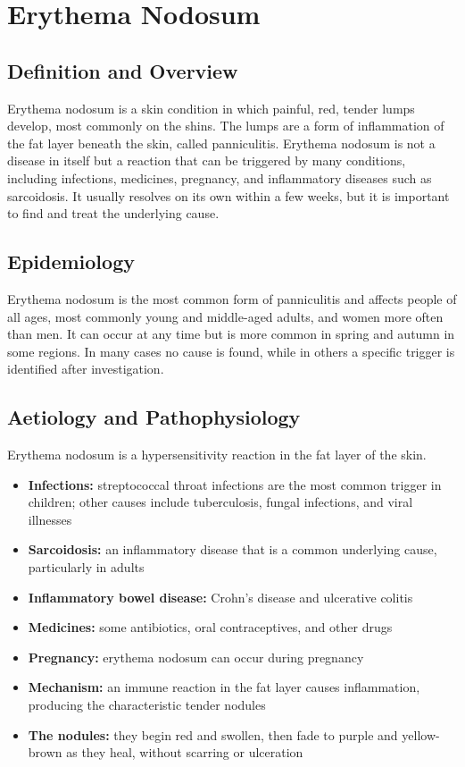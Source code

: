 \chapter{Erythema Nodosum}

\section*{Definition and Overview}
Erythema nodosum is a skin condition in which painful, red, tender lumps develop, most commonly on the shins. The lumps are a form of inflammation of the fat layer beneath the skin, called panniculitis. Erythema nodosum is not a disease in itself but a reaction that can be triggered by many conditions, including infections, medicines, pregnancy, and inflammatory diseases such as sarcoidosis. It usually resolves on its own within a few weeks, but it is important to find and treat the underlying cause.

\section*{Epidemiology}
Erythema nodosum is the most common form of panniculitis and affects people of all ages, most commonly young and middle-aged adults, and women more often than men. It can occur at any time but is more common in spring and autumn in some regions. In many cases no cause is found, while in others a specific trigger is identified after investigation.

\section*{Aetiology and Pathophysiology}
Erythema nodosum is a hypersensitivity reaction in the fat layer of the skin.
\begin{itemize}
    \item \textbf{Infections:} streptococcal throat infections are the most common trigger in children; other causes include tuberculosis, fungal infections, and viral illnesses
    \item \textbf{Sarcoidosis:} an inflammatory disease that is a common underlying cause, particularly in adults
    \item \textbf{Inflammatory bowel disease:} Crohn's disease and ulcerative colitis
    \item \textbf{Medicines:} some antibiotics, oral contraceptives, and other drugs
    \item \textbf{Pregnancy:} erythema nodosum can occur during pregnancy
    \item \textbf{Mechanism:} an immune reaction in the fat layer causes inflammation, producing the characteristic tender nodules
    \item \textbf{The nodules:} they begin red and swollen, then fade to purple and yellow-brown as they heal, without scarring or ulceration
\end{itemize}

